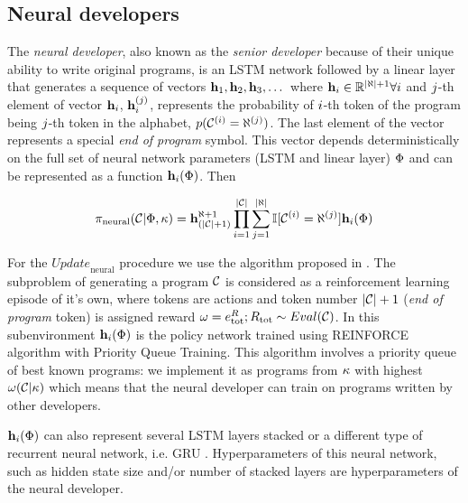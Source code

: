 \newpage \subsection{Neural developers}
\label{sec:neural}

The \emph{neural developer}, also known as the \emph{senior developer} because of their unique ability to write original programs, is an LSTM \cite{hochreiterLongShorttermMemory1997} network followed by a linear layer that generates a sequence of vectors $\mathbf{h}_{1},\mathbf{h}_{2},\mathbf{h}_{3},\dots$ where $\mathbf{h}_i \in \mathbb{R}^{|\aleph| + 1} \forall i$ and $j$-th element of vector $\mathbf{h}_i$, $\mathbf{h}_i^{(j)}$, represents the probability of $i$-th token of the program being $j$-th token in the alphabet, $p(\mathcal{C}^{(i)}=\aleph^{(j)})$.
The last element of the vector represents a special \emph{end of program} symbol.
This vector depends deterministically on the full set of neural network parameters (LSTM and linear layer) $\Phi$ and can be represented as a function $\mathbf{h}_i(\Phi)$.
Then

\begin{equation}
    \pi_\text{neural}(\mathcal{C} | \Phi, \kappa) = \mathbf{h}_{(|\mathcal{C}|+1)}^{\aleph+1}
    \prod\limits_{i=1}^{|\mathcal{C}|}
    \sum\limits_{j=1}^{|\aleph|} \mathbb{I} [\mathcal{C}^{(i)}=\aleph^{(j)}]
    \mathbf{h}_i(\Phi)
\end{equation}

For the $\mathit{Update}_\text{neural}$ procedure we use the algorithm proposed in \cite{abolafiaNeuralProgramSynthesis2018}.
The subproblem of generating a program $\mathcal{C}$ is considered as a reinforcement learning episode of it's own, where tokens are actions and token number $|\mathcal{C}|+1$ (\emph{end of program} token) is assigned reward $\omega = e^R_\text{tot}; R_\text{tot} \sim Eval(\mathcal{C})$. 
In this subenvironment $\mathbf{h}_i(\Phi)$ is the policy network \cite[chapter 13]{suttonReinforcementLearningSecond2018} trained using REINFORCE algorithm with Priority Queue Training.
This algorithm involves a priority queue of best known programs: we implement it as programs from $\kappa$ with highest $\omega(\mathcal{C}|\kappa)$ which means that the neural developer can train on programs written by other developers.

$\mathbf{h}_i(\Phi)$ can also represent several LSTM layers stacked or a different type of recurrent neural network, i.e. GRU \cite{choPropertiesNeuralMachine2014,chungEmpiricalEvaluationGated2014}.
Hyperparameters of this neural network, such as hidden state size and/or number of stacked layers are hyperparameters of the neural developer.  

